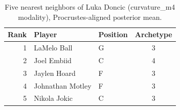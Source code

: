 \begin{table}[htbp]
  \centering\small
  \begin{tabular}{rllc}
    \toprule
    Rank & Player & Position & Archetype \\
    \midrule
    1 & LaMelo Ball & G & 3 \\
    2 & Joel Embiid & C & 4 \\
    3 & Jaylen Hoard & F & 3 \\
    4 & Johnathan Motley & F & 3 \\
    5 & Nikola Jokic & C & 3 \\
    \bottomrule
  \end{tabular}
  \caption{Five nearest neighbors of Luka Doncic (curvature_m4 modality), Procrustes-aligned posterior mean.}
  \label{tab:Luka_Doncic_neighbors_curvature_m4}
\end{table}

